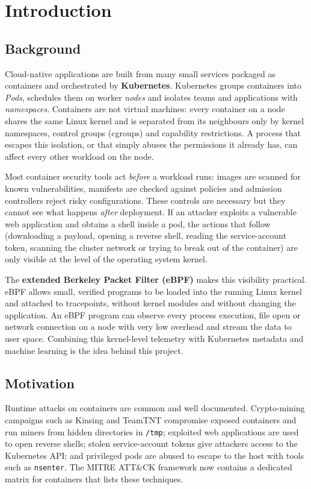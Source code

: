\chapter{Introduction}

\section{Background}

Cloud-native applications are built from many small services packaged as containers
and orchestrated by \textbf{Kubernetes}. Kubernetes groups containers into
\emph{Pods}, schedules them on worker \emph{nodes} and isolates teams and applications
with \emph{namespaces}. Containers are not virtual machines: every container on a node
shares the same Linux kernel and is separated from its neighbours only by kernel
namespaces, control groups (cgroups) and capability restrictions. A process that
escapes this isolation, or that simply abuses the permissions it already has, can
affect every other workload on the node.

Most container security tools act \emph{before} a workload runs: images are scanned
for known vulnerabilities, manifests are checked against policies and admission
controllers reject risky configurations. These controls are necessary but they cannot
see what happens \emph{after} deployment. If an attacker exploits a vulnerable web
application and obtains a shell inside a pod, the actions that follow (downloading a
payload, opening a reverse shell, reading the service-account token, scanning the
cluster network or trying to break out of the container) are only visible at the level
of the operating system kernel.

The \textbf{extended Berkeley Packet Filter (eBPF)} makes this visibility practical.
eBPF allows small, verified programs to be loaded into the running Linux kernel and
attached to tracepoints, without kernel modules and without changing the application.
An eBPF program can observe every process execution, file open or network connection
on a node with very low overhead and stream the data to user space. Combining this
kernel-level telemetry with Kubernetes metadata and machine learning is the idea
behind this project.

\section{Motivation}

Runtime attacks on containers are common and well documented. Crypto-mining
campaigns such as Kinsing and TeamTNT compromise exposed containers and run miners
from hidden directories in \texttt{/tmp}; exploited web applications are used to open
reverse shells; stolen service-account tokens give attackers access to the Kubernetes
API; and privileged pods are abused to escape to the host with tools such as
\texttt{nsenter}. The MITRE ATT\&CK framework now contains a dedicated matrix for
containers that lists these techniques.

